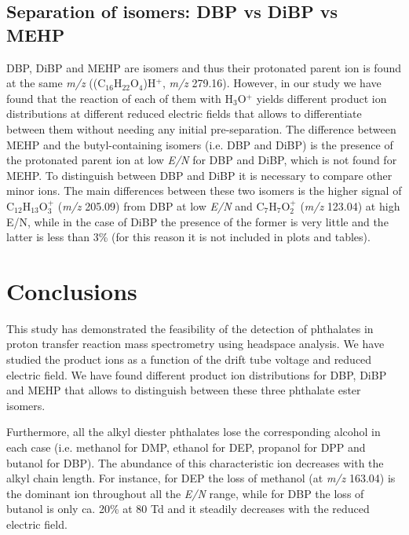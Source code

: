 \subsection{Separation of isomers: DBP vs DiBP vs MEHP }
DBP, DiBP and MEHP are isomers and thus their protonated parent ion is found at the same \textit{m/z} ((C$_{16}$H$_{22}$O$_4$)H$^+$, \textit{m/z} 279.16). However, in our study we have found that the reaction of each of them with H$_3$O$^+$ yields different product ion distributions at different reduced electric fields that allows to differentiate between them without needing any initial pre-separation.
    The difference between MEHP and the butyl-containing isomers (i.e. DBP and DiBP)  is the presence of the protonated parent ion at low \textit{E/N} for DBP and DiBP, which is not found for MEHP. To distinguish between DBP and DiBP it is necessary to compare other minor ions.
The main differences between these two isomers is the higher signal of C$_{12}$H$_{13}$O$_3^+$ (\textit{m/z} 205.09) from DBP at low \textit{E/N} and C$_{7}$H$_{7}$O$_2^+$ (\textit{m/z} 123.04) at high E/N, while in the case of DiBP the presence of the former is very little and the latter is less than 3\% (for this reason it is not included in plots and tables). 















\section{Conclusions}
    This study has demonstrated the feasibility of the  detection of phthalates in proton transfer reaction mass spectrometry using headspace analysis. 
We  have studied the product ions as a function of the drift tube voltage and reduced electric field.
    We have found different product ion distributions for  DBP, DiBP and MEHP that allows to distinguish between these three phthalate ester isomers.
    
Furthermore, all the alkyl diester phthalates lose  the corresponding alcohol in each case (i.e. methanol for DMP, ethanol for DEP, propanol for DPP and butanol for DBP). The abundance of this characteristic ion decreases with  the alkyl chain length. For instance, for DEP the loss of methanol (at \textit{m/z} 163.04) is the dominant ion throughout all the \textit{E/N} range, while for DBP the loss of butanol is only ca. 20\% at 80 Td and it steadily decreases with the reduced electric field. 

